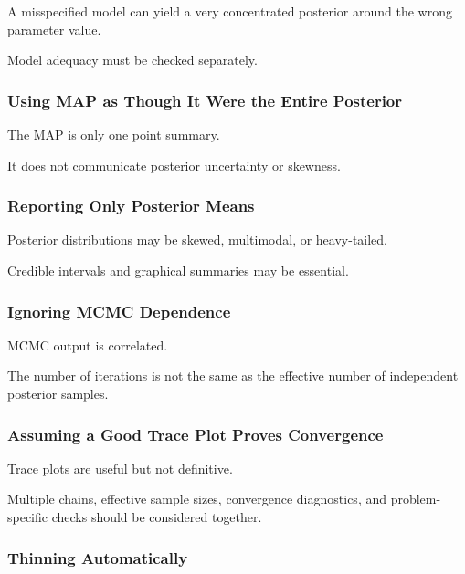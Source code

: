 A misspecified model can yield a very concentrated posterior around the
wrong parameter value.

Model adequacy must be checked separately.

\subsubsection{Using MAP as Though It Were the Entire Posterior}

The MAP is only one point summary.

It does not communicate posterior uncertainty or skewness.

\subsubsection{Reporting Only Posterior Means}

Posterior distributions may be skewed, multimodal, or heavy-tailed.

Credible intervals and graphical summaries may be essential.

\subsubsection{Ignoring MCMC Dependence}

MCMC output is correlated.

The number of iterations is not the same as the effective number of
independent posterior samples.

\subsubsection{Assuming a Good Trace Plot Proves Convergence}

Trace plots are useful but not definitive.

Multiple chains, effective sample sizes, convergence diagnostics, and
problem-specific checks should be considered together.

\subsubsection{Thinning Automatically}

